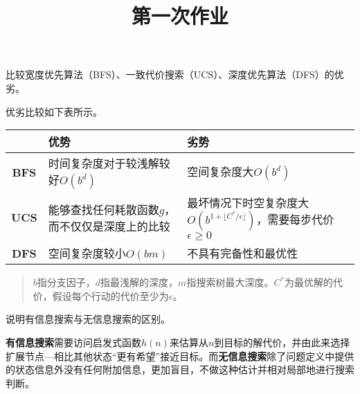 \endofdump  %


    \title{第一次作业}
    \maketitle

    \begin{problem}
        比较宽度优先算法（BFS）、一致代价搜索（UCS）、深度优先算法（DFS）的优劣。
    \end{problem}

    \begin{solution}
        优劣比较如下表所示。
        \begin{table}[H]
            \centering
            \begin{tabular}{>{\bfseries}cp{7cm}p{7cm}}
                \toprule
                    & \bfseries\hfil 优势 \hfil & \bfseries\hfil 劣势 \hfil \\
                \midrule
                BFS & 时间复杂度对于较浅解较好$O(b^{d})$ & 空间复杂度大$O(b^d)$ \\
                UCS & 能够查找任何耗散函数$g$，而不仅仅是深度上的比较 & 最坏情况下时空复杂度大$O(b^{1+\lfloor C^\ast/\epsilon \rfloor})$，需要每步代价$\epsilon\geq 0$      \\
                DFS & 空间复杂度较小$O(bm)$      & 不具有完备性和最优性      \\
                \bottomrule
            \end{tabular}
            \begin{quotation}
                \footnotesize $b$指分支因子，$d$指最浅解的深度，$m$指搜索树最大深度。$C^\ast$为最优解的代价，假设每个行动的代价至少为$\epsilon$。
            \end{quotation}
        \end{table}
    \end{solution}

    \begin{problem}
        说明有信息搜索与无信息搜索的区别。
    \end{problem}

    \begin{solution}
        \textbf{有信息搜索}需要访问启发式函数$h(n)$来估算从$n$到目标的解代价，并由此来选择扩展节点---相比其他状态“更有希望”接近目标。而\textbf{无信息搜索}除了问题定义中提供的状态信息外没有任何附加信息，更加盲目，不做这种估计并相对局部地进行搜索判断。
    \end{solution}

